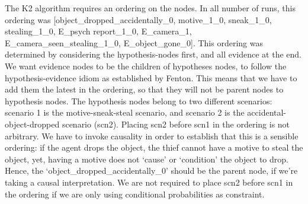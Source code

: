 \documentclass[12pt]{article}
\begin{document}
The K2 algorithm requires an ordering on the nodes. In all number of runs, this ordering was 
[object\_dropped\_accidentally\_0, motive\_1\_0, sneak\_1\_0, stealing\_1\_0, E\_psych report\_1\_0, E\_camera\_1, E\_camera\_seen\_stealing\_1\_0, E\_object\_gone\_0]. This ordering was determined by considering the hypothesis-nodes first, and all evidence at the end. We want evidence nodes to be the children of hypotheses nodes, to follow the hypothesis-evidence idiom as established by Fenton. This means that we have to add them the latest in the ordering, so that they will not be parent nodes to hypothesis nodes. The hypothesis nodes belong to two different scenarios: scenario 1 is the motive-sneak-steal scenario, and scenario 2 is the accidental-object-dropped scenario (scn2). Placing scn2 before scn1 in the ordering is not arbitrary. We have to invoke causality in order to establish that this is a sensible ordering: if the agent drops the object, the thief cannot have a motive to steal the object, yet, having a motive does not `cause' or `condition' the object to drop. Hence, the `object\_dropped\_accidentally\_0' should be the parent node, if we're taking a causal interpretation. We are not required to place scn2 before scn1 in the ordering if we are only using conditional probabilities as constraint.
 
\end{document}

